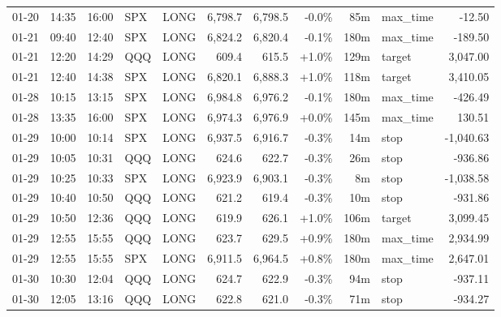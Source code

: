 \documentclass[11pt,a4paper,twoside]{article}
\begin{document}
\begin{center}
\begin{longtable}{>{\color{txtmain}}l l l l l r r r r >{\color{txtmain}}l r}
01-20 & 14:35 & 16:00 & SPX & LONG & 6,798.7 & 6,798.5 & \textcolor{lossred}{-0.0\%} & 85m & max\_time & \textcolor{lossred}{-12.50} \\
01-21 & 09:40 & 12:40 & SPX & LONG & 6,824.2 & 6,820.4 & \textcolor{lossred}{-0.1\%} & 180m & max\_time & \textcolor{lossred}{-189.50} \\
01-21 & 12:20 & 14:29 & QQQ & LONG & 609.4 & 615.5 & \textcolor{wingreen}{+1.0\%} & 129m & target & \textcolor{wingreen}{3,047.00} \\
01-21 & 12:40 & 14:38 & SPX & LONG & 6,820.1 & 6,888.3 & \textcolor{wingreen}{+1.0\%} & 118m & target & \textcolor{wingreen}{3,410.05} \\
01-28 & 10:15 & 13:15 & SPX & LONG & 6,984.8 & 6,976.2 & \textcolor{lossred}{-0.1\%} & 180m & max\_time & \textcolor{lossred}{-426.49} \\
01-28 & 13:35 & 16:00 & SPX & LONG & 6,974.3 & 6,976.9 & \textcolor{wingreen}{+0.0\%} & 145m & max\_time & \textcolor{wingreen}{130.51} \\
01-29 & 10:00 & 10:14 & SPX & LONG & 6,937.5 & 6,916.7 & \textcolor{lossred}{-0.3\%} & 14m & stop & \textcolor{lossred}{-1,040.63} \\
01-29 & 10:05 & 10:31 & QQQ & LONG & 624.6 & 622.7 & \textcolor{lossred}{-0.3\%} & 26m & stop & \textcolor{lossred}{-936.86} \\
01-29 & 10:25 & 10:33 & SPX & LONG & 6,923.9 & 6,903.1 & \textcolor{lossred}{-0.3\%} & 8m & stop & \textcolor{lossred}{-1,038.58} \\
01-29 & 10:40 & 10:50 & QQQ & LONG & 621.2 & 619.4 & \textcolor{lossred}{-0.3\%} & 10m & stop & \textcolor{lossred}{-931.86} \\
01-29 & 10:50 & 12:36 & QQQ & LONG & 619.9 & 626.1 & \textcolor{wingreen}{+1.0\%} & 106m & target & \textcolor{wingreen}{3,099.45} \\
01-29 & 12:55 & 15:55 & QQQ & LONG & 623.7 & 629.5 & \textcolor{wingreen}{+0.9\%} & 180m & max\_time & \textcolor{wingreen}{2,934.99} \\
01-29 & 12:55 & 15:55 & SPX & LONG & 6,911.5 & 6,964.5 & \textcolor{wingreen}{+0.8\%} & 180m & max\_time & \textcolor{wingreen}{2,647.01} \\
01-30 & 10:30 & 12:04 & QQQ & LONG & 624.7 & 622.9 & \textcolor{lossred}{-0.3\%} & 94m & stop & \textcolor{lossred}{-937.11} \\
01-30 & 12:05 & 13:16 & QQQ & LONG & 622.8 & 621.0 & \textcolor{lossred}{-0.3\%} & 71m & stop & \textcolor{lossred}{-934.27} \\

\end{longtable}
\end{center}
\end{document}
